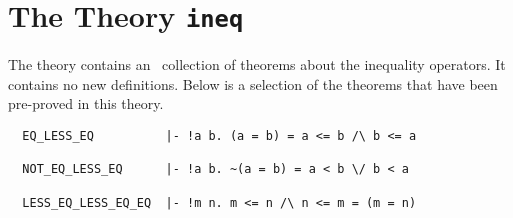 \section{The Theory {\tt ineq}}

The theory  contains an \adhoc\ collection of
theorems about the inequality operators. It contains no new definitions.
Below is a selection of the theorems that have been pre-proved in this theory.
\begin{hol}
\begin{verbatim}
  EQ_LESS_EQ          |- !a b. (a = b) = a <= b /\ b <= a

  NOT_EQ_LESS_EQ      |- !a b. ~(a = b) = a < b \/ b < a

  LESS_EQ_LESS_EQ_EQ  |- !m n. m <= n /\ n <= m = (m = n)
\end{verbatim}\end{hol}
